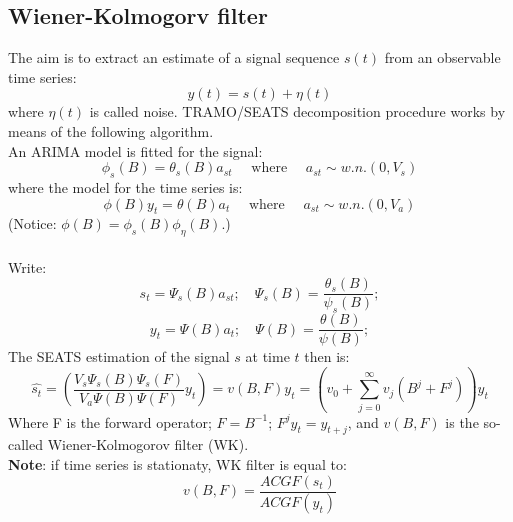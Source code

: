 \documentclass{article}
\begin{document}
\subsection*{Wiener-Kolmogorv filter}
 The aim is to extract an estimate of a signal sequence $s(t)$ from an observable time series:
 \begin{equation*}
 y(t)=s(t)+\eta(t)
 \end{equation*}
 where $\eta(t)$ is called noise. TRAMO/SEATS decomposition procedure works by means of the following algorithm.\\
An ARIMA model is fitted for the signal:
\begin{equation*}
\phi_{s}(B)=\theta_{s}(B)a_{st} \quad \mbox{~where~} \quad a_{st} \sim w.n.(0,V_{s})
\end{equation*}
where the model for the time series is:
\begin{equation*}
\phi(B)y_{t}=\theta(B)a_{t} \quad \mbox{~where~} \quad a_{st}\sim w.n.(0,V_{a})
\end{equation*}
(Notice: $\phi(B)=\phi_{s}(B)\phi_{\eta}(B)$.)\\
\bigskip
\\
Write:
\begin{equation*}
s_{t}=\Psi_{s}(B)a_{st}; \quad \Psi_{s}(B)=\frac{\theta_{s}(B)}{\psi_{s}(B)} ;
\end{equation*}
\begin{equation*}
y_{t}=\Psi(B)a_{t}; \quad \Psi(B)=\frac{\theta(B)}{\psi(B)} ;
\end{equation*}
The SEATS estimation of the signal $s$ at time $t$ then is:
\begin{equation*}
\hat{s_{t}}=\left ( \frac {V_{s}\Psi_{s}(B)\Psi_{s}(F)}{V_{a}\Psi(B)\Psi(F)} y_{t}\right )=v(B,F)y_{t}=\left ( v_{0}+\sum\limits_{j=0}^\infty  v_{j} (B^{j}+F^{j}) \right) y_{t}
\end{equation*}
Where F is the forward operator; $F=B^{-1}$; $F^{j}y_{t}=y_{t+j}$, and $v(B,F)$ is the so-called Wiener-Kolmogorov filter (WK).\\\textbf{Note}: if time series is stationaty, WK filter is equal to:
\begin{equation*}
v(B,F)=\frac{ACGF(s_{t})}{ACGF(y_{t})}
\end{equation*}
\end{document}
